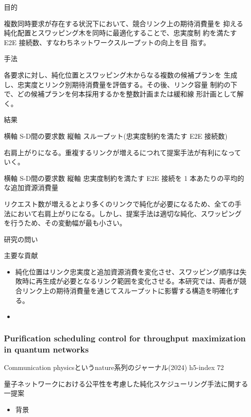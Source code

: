 \documentclass[conference]{IEEEtran}
\begin{document}
目的

複数同時要求が存在する状況下において、競合リンク上の期待消費量を
抑える純化配置とスワッピング木を同時に最適化することで、忠実度制
約を満たす E2E 接続数、すなわちネットワークスループットの向上を目
指す。


手法

各要求に対し、純化位置とスワッピング木からなる複数の候補プランを
生成し、忠実度とリンク別期待消費量を評価する。その後、リンク容量
制約の下で、どの候補プランを何本採用するかを整数計画または緩和線
形計画として解く。


結果

横軸 S-D間の要求数
縦軸 スループット(忠実度制約を満たす E2E 接続数)

右肩上がりになる。重複するリンクが増えるにつれて提案手法が有利になって
いく。


横軸 S-D間の要求数
縦軸 忠実度制約を満たす E2E 接続を 1 本あたりの平均的な追加資源消費量

リクエスト数が増えるとより多くのリンクで純化が必要になるため、全ての手
法において右肩上がりになる。しかし、提案手法は適切な純化、スワッピング
を行うため、その変動幅が最も小さい。

研究の問い

主要な貢献

\begin{itemize}
\item 純化位置はリンク忠実度と追加資源消費を変化させ、スワッピング順序は失
敗時に再生成が必要となるリンク範囲を変化させる。本研究では、両者が競
合リンク上の期待消費量を通じてスループットに影響する構造を明確化する。

\item 
\end{itemize}



\subsubsection{Purification scheduling control for throughput maximization in quantum networks}
\label{sec:org282792c}


Communication physicsというnature系列のジャーナル(2024)
h5-index 72



量子ネットワークにおける公平性を考慮した純化スケジューリング手法に関する一提案


\begin{itemize}
\item 背景
\end{itemize}
\end{document}
